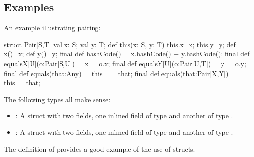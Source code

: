 \subsection{Examples}

An example illustrating pairing:
\begin{xten}
struct Pair[S,T]  {
  val x: S;
  val y: T;
  def this(x: S, y: T) {
    this.x=x;
    this.y=y;
  }
  def x()=x;
  def y()=y;  
  final def hashCode() = x.hashCode() + y.hashCode();
  final def equalsX[U](o:Pair[S,U]) = x==o.x;
  final def equalsY[U](o:Pair[U,T]) = y==o.y;
  final def equals(that:Any) = this == that;
  final def equals(that:Pair[X,Y]) = this==that;
}
\end{xten}

The following types all make sense: 
\begin{itemize}
\item {}: A struct with two fields, one inlined field of type  and another of type . 
\item {}: A struct with two fields, one inlined field of type  and another of type . 
\end{itemize}

The definition of  provides a good example of the use of structs.
